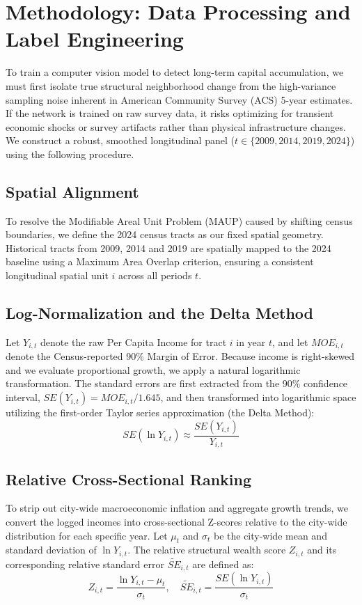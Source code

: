 \documentclass[12pt]{article}
\begin{document}
\section{Methodology: Data Processing and Label Engineering}

To train a computer vision model to detect long-term capital accumulation, we must first isolate true structural neighborhood change from the high-variance sampling noise inherent in American Community Survey (ACS) 5-year estimates. If the network is trained on raw survey data, it risks optimizing for transient economic shocks or survey artifacts rather than physical infrastructure changes. We construct a robust, smoothed longitudinal panel ($t \in \{2009, 2014, 2019, 2024\}$) using the following procedure.

\subsection{Spatial Alignment}
To resolve the Modifiable Areal Unit Problem (MAUP) caused by shifting census boundaries, we define the 2024 census tracts as our fixed spatial geometry. Historical tracts from 2009, 2014 and 2019 are spatially mapped to the 2024 baseline using a Maximum Area Overlap criterion, ensuring a consistent longitudinal spatial unit $i$ across all periods $t$.

\subsection{Log-Normalization and the Delta Method}
Let $Y_{i,t}$ denote the raw Per Capita Income for tract $i$ in year $t$, and let $MOE_{i,t}$ denote the Census-reported 90\% Margin of Error. Because income is right-skewed and we evaluate proportional growth, we apply a natural logarithmic transformation. The standard errors are first extracted from the 90\% confidence interval, $SE(Y_{i,t}) = MOE_{i,t} / 1.645$, and then transformed into logarithmic space utilizing the first-order Taylor series approximation (the Delta Method):
\begin{equation}
SE(\ln Y_{i,t}) \approx \frac{SE(Y_{i,t})}{Y_{i,t}}
\end{equation}

\subsection{Relative Cross-Sectional Ranking}
To strip out city-wide macroeconomic inflation and aggregate growth trends, we convert the logged incomes into cross-sectional Z-scores relative to the city-wide distribution for each specific year. Let $\mu_t$ and $\sigma_t$ be the city-wide mean and standard deviation of $\ln Y_{i,t}$. The relative structural wealth score $Z_{i,t}$ and its corresponding relative standard error $\tilde{SE}_{i,t}$ are defined as:
\begin{equation}
Z_{i,t} = \frac{\ln Y_{i,t} - \mu_t}{\sigma_t}, \quad \tilde{SE}_{i,t} = \frac{SE(\ln Y_{i,t})}{\sigma_t}
\end{equation}
\end{document}
